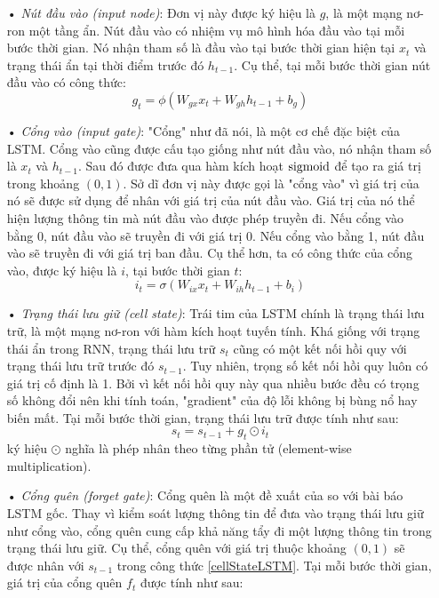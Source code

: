 \begin{itemize}
	\item[•] \textit{Nút đầu vào (input node)}: Đơn vị này được ký hiệu là $g$, là một mạng nơ-ron một tầng ẩn. Nút đầu vào có nhiệm vụ mô hình hóa đầu vào tại mỗi bước thời gian. Nó nhận tham số là đầu vào tại bước thời gian hiện tại $x_t$ và trạng thái ẩn tại thời điểm trước đó $h_{t-1}$. Cụ thể, tại mỗi bước thời gian nút đầu vào có công thức:
	\begin{equation} \label{inputNodeLSTM}
		g_t = \phi \left(W_{gx}x_t + W_{gh}h_{t-1} + b_g \right)
	\end{equation}
	\item[•] \textit{Cổng vào (input gate)}: "Cổng" như đã nói, là một cơ chế đặc biệt của LSTM. Cổng vào cũng được cấu tạo giống như nút đầu vào, nó nhận tham số là $x_t$ và $h_{t-1}$. Sau đó được đưa qua hàm kích hoạt $\mathrm{sigmoid}$ để tạo ra giá trị trong khoảng $(0,1)$. Sở dĩ đơn vị này được gọi là "cổng vào" vì giá trị của nó sẽ được sử dụng để nhân với giá trị của nút đầu vào. Giá trị của nó thể hiện lượng thông tin mà nút đầu vào được phép truyền đi. Nếu cổng vào bằng 0, nút đầu vào sẽ truyền đi với giá trị 0. Nếu cổng vào bằng 1, nút đầu vào sẽ truyền đi với giá trị ban đầu. Cụ thể hơn, ta có công thức của cổng vào, được ký hiệu là $i$, tại bước thời gian $t$:
	\begin{equation} \label{inputGateLSTM}
		i_t = \sigma \left(W_{ix}x_t + W_{ih}h_{t-1} + b_i \right)
	\end{equation}
	\item[•] \textit{Trạng thái lưu giữ (cell state)}: Trái tim của LSTM chính là trạng thái lưu trữ, là một mạng nơ-ron với hàm kích hoạt tuyến tính. Khá giống với trạng thái ẩn trong RNN, trạng thái lưu trữ $s_t$ cũng có một kết nối hồi quy với trạng thái lưu trữ trước đó $s_{t-1}$. Tuy nhiên, trọng số kết nối hồi quy luôn có giá trị cố định là 1. Bởi vì kết nối hồi quy này qua nhiều bước đều có trọng số không đổi nên khi tính toán, "gradient" của độ lỗi không bị bùng nổ hay biến mất. Tại mỗi bước thời gian, trạng thái lưu trữ được tính như sau:
	\begin{equation} \label{cellStateLSTM}
		s_t = s_{t-1} + g_t \odot i_t
	\end{equation}
	ký hiệu $\odot$ nghĩa là phép nhân theo từng phần tử (element-wise multiplication).
	\item[•] \textit{Cổng quên (forget gate)}: Cổng quên là một đề xuất của \cite{gers2000} so với bài báo LSTM gốc. Thay vì kiểm soát lượng thông tin để đưa vào trạng thái lưu giữ như cổng vào, cổng quên cung cấp khả năng tẩy đi một lượng thông tin trong trạng thái lưu giữ. Cụ thể, cổng quên với giá trị thuộc khoảng $(0,1)$ sẽ được nhân với $s_{t-1}$ trong công thức \ref{cellStateLSTM}. Tại mỗi bước thời gian, giá trị của cổng quên $f_t$ được tính như sau:

\end{itemize}

